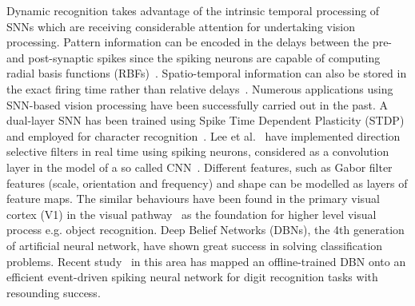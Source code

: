 \documentclass[journal]{journal}
\begin{document}
Dynamic recognition takes advantage of the intrinsic temporal processing of SNNs which are receiving considerable attention for  undertaking vision processing.
Pattern information can be encoded in the delays between the pre- and post-synaptic spikes since the spiking neurons are capable of computing radial basis functions (RBFs)~\cite{hopfield1995pattern}.
Spatio-temporal information can also be stored in the exact firing time rather than relative delays~\cite{natschlager1998spatial}.
Numerous applications using SNN-based vision processing have been successfully carried out in the past. 
A dual-layer SNN has been trained using Spike Time Dependent Plasticity (STDP) and employed for character recognition~\cite{gupta2007character}. 
Lee et al.~\cite{6467270} have implemented direction selective filters in real time using spiking neurons, considered as a convolution layer in the model of a so called CNN~\cite{camunas2012event}. 
Different features, such as Gabor filter features (scale, orientation and frequency) and shape can be modelled as layers of feature maps. 
The similar behaviours have been found in the primary visual cortex (V1) in the visual pathway~\cite{rehn2007network} as the foundation for higher level visual process e.g. object recognition.
Deep Belief Networks (DBNs), the 4th generation of artificial neural network, have shown great success in solving classification problems. 
Recent study~\cite{o2013real} in this area has mapped an offline-trained DBN onto an efficient event-driven spiking neural network for digit recognition tasks with resounding success.
\end{document}
